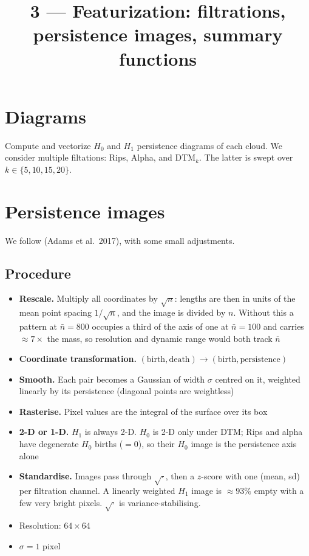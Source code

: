 \documentclass[11pt]{article}
\title{3 --- Featurization: filtrations, persistence images, summary functions}
\date{}
\newcommand{\nb}{\bar n}
\begin{document}
\maketitle

\section{Diagrams}
Compute and vectorize $H_0$ and $H_1$ persistence diagrams of each cloud. We consider multiple filtations: Rips, Alpha, and DTM$_k$.
The latter is swept over $k \in \{5, 10, 15, 20\}$.

\section{Persistence images}
We follow (Adams et al.\ 2017), with some small adjustments.

\subsection*{Procedure}
\begin{itemize}
  \item \textbf{Rescale.} Multiply all coordinates by $\sqrt n$: lengths are then in units of the mean point spacing $1/\sqrt n$, and the image is divided by $n$. Without this a pattern at $\nb=800$ occupies a third of the axis of one at $\nb=100$ and carries $\approx7\times$ the mass, so resolution and dynamic range would both track $\nb$
  \item \textbf{Coordinate transformation.} $(\text{birth},\text{death}) \to (\text{birth},\text{persistence})$
  \item \textbf{Smooth.} Each pair becomes a Gaussian of width $\sigma$ centred on it, weighted linearly by its persistence (diagonal points are weightless)
  \item \textbf{Rasterise.} Pixel values are the integral of the surface over its box
  \item \textbf{2-D or 1-D.} $H_1$ is always 2-D. $H_0$ is 2-D only under DTM; Rips and alpha have degenerate $H_0$ births ($=0$), so their $H_0$ image is the persistence axis alone
  \item \textbf{Standardise.} Images pass through $\sqrt{\cdot}$, then a $z$-score with one (mean, sd) per filtration channel.
  A linearly weighted $H_1$ image is $\approx93\%$ empty with a few very bright pixels.
  $\sqrt{\cdot}$ is variance-stabilising.
  \item Resolution: $64 \times 64$
  \item $\sigma = 1$ pixel
\end{itemize}
\end{document}
